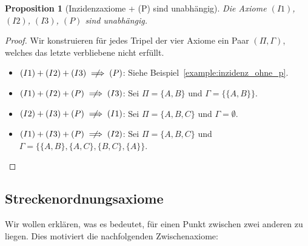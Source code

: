 \documentclass[a4paper,12pt]{article}
\theoremstyle{break}
\newtheorem{proposition}[definition]{Proposition}
\newcommand{\notimplies}{\centernot\implies}
\begin{document}
\begin{proposition}[Inzidenzaxiome + (P) sind unabhängig]
Die Axiome \((I1)\), \((I2)\), \((I3)\), \((P)\) sind unabhängig.
\end{proposition}

\begin{proof}
Wir konstruieren für jedes Tripel der vier Axiome ein Paar \((\Pi, \Gamma)\), welches das letzte verbliebene nicht erfüllt.

\begin{itemize}
    \item \((I1) + (I2) + (I3) \notimplies (P)\): Siehe Beispiel~\ref{example:inzidenz_ohne_p}.
    \item \((I1) + (I2) + (P) \notimplies (I3)\): Sei \(\Pi = \{A, B\}\) und \(\Gamma = \{\{A, B\}\}\).
    \item \((I2) + (I3) + (P) \notimplies (I1)\): Sei \(\Pi = \{A, B, C\}\) und \(\Gamma = \emptyset\).
    \item \((I1) + (I3) + (P) \notimplies (I2)\): Sei \(\Pi = \{A, B, C\}\) und \(\Gamma = \{\{A, B\}, \{A, C\}, \{B, C\}, \{A\}\}\).
\end{itemize}
\begin{center}
\end{center}
\end{proof}

\subsection{Streckenordnungsaxiome}

Wir wollen erklären, was es bedeutet, für einen Punkt zwischen zwei anderen zu liegen. Dies motiviert die nachfolgenden Zwischenaxiome:
\end{document}
